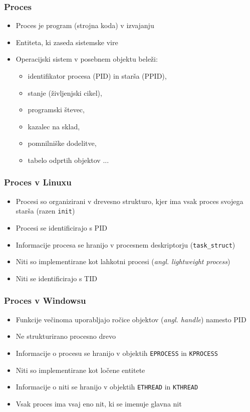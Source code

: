 \documentclass{beamer}
\begin{document}
\begin{frame}
	\frametitle{Proces}
	\begin{itemize}
		\item Proces je program (strojna koda) v izvajanju
		\item Entiteta, ki zaseda sistemske vire
		\item Operacijski sistem v posebnem objektu beleži:
		      \begin{itemize}
		      	\item identifikator procesa (PID) in starša (PPID),
		      	\item stanje (življenjski cikel),
		      	\item programski števec,
		      	\item kazalec na sklad,
		      	\item pomnilniške dodelitve,
		      	\item tabelo odprtih objektov ...
		      \end{itemize}
	\end{itemize}
\end{frame}

\begin{frame}
	\frametitle{Proces v Linuxu}
	\begin{itemize}
		\item Procesi so organizirani v drevesno strukturo, kjer ima vsak proces svojega starša (razen \texttt{init})
		\item Procesi se identificirajo s PID
		\item Informacije procesa se hranijo v procesnem deskriptorju (\texttt{task\_struct})
		\item Niti so implementirane kot lahkotni procesi (\textit{angl. lightweight process})
		\item Niti se identificirajo s TID
	\end{itemize}
\end{frame}

\begin{frame}
	\frametitle{Proces v Windowsu}
	\begin{itemize}
		\item Funkcije večinoma uporabljajo ročice objektov (\textit{angl. handle}) namesto PID
		\item Ne strukturirano procesno drevo
		\item Informacije o procesu se hranijo v objektih \texttt{EPROCESS} in \texttt{KPROCESS}
		\item Niti so implementirane kot ločene entitete
		\item Informacije o niti se hranijo v objektih \texttt{ETHREAD} in \texttt{KTHREAD}
		\item Vsak proces ima vsaj eno nit, ki se imenuje glavna nit
	\end{itemize}
\end{frame}
\end{document}
